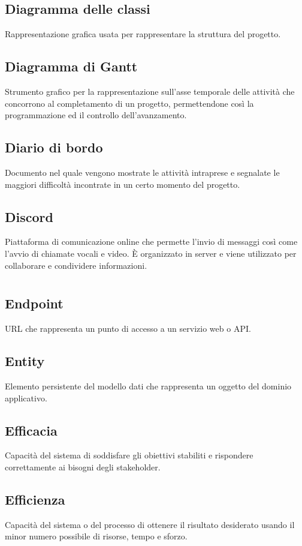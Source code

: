 \documentclass[a4paper,12pt]{article}
\begin{document}
          \subsection*{Diagramma delle classi}
			Rappresentazione grafica usata per rappresentare la struttura del progetto.
          \subsection*{Diagramma di Gantt}
			Strumento grafico per la rappresentazione sull'asse temporale delle attività che concorrono al completamento di un progetto, permettendone così la programmazione ed il controllo dell'avanzamento.
          \subsection*{Diario di bordo}
			Documento nel quale vengono mostrate le attività intraprese e segnalate le maggiori difficoltà incontrate in un certo momento del progetto.
          \subsection*{Discord}
			Piattaforma di comunicazione online che permette l'invio di messaggi così come l'avvio di chiamate vocali e video. È organizzato in server e viene utilizzato per collaborare e condividere informazioni.  
      
     \newpage 
        \section{}
        
          \subsection*{Endpoint}
			URL che rappresenta un punto di accesso a un servizio web o API.
          \subsection*{Entity}
			Elemento persistente del modello dati che rappresenta un oggetto del dominio applicativo.
          \subsection*{Efficacia}
			Capacità del sistema di soddisfare gli obiettivi stabiliti e rispondere correttamente ai bisogni degli stakeholder.
          \subsection*{Efficienza}
			Capacità del sistema o del processo di ottenere il risultato desiderato usando il minor numero possibile di risorse, tempo e sforzo.
\end{document}
